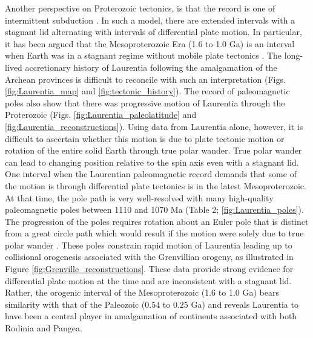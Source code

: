 \documentclass[twocolumn, switch]{article} %
\begin{document}
Another perspective on Proterozoic tectonics, is that the record is one of intermittent subduction \citep{Silver2008a, ONeill2013a}. In such a model, there are extended intervals with a stagnant lid alternating with intervals of differential plate motion. In particular, it has been argued that the Mesoproterozoic Era (1.6 to 1.0 Ga) is an interval when Earth was in a stagnant regime without mobile plate tectonics \citep{Silver2008a, ONeill2013a}. The long-lived accretionary history of Laurentia following the amalgamation of the Archean provinces is difficult to reconcile with such an interpretation (Figs. \ref{fig:Laurentia_map} and \ref{fig:tectonic_history}). The record of paleomagnetic poles also show that there was progressive motion of Laurentia through the Proterozoic (Figs. \ref{fig:Laurentia_paleolatitude} and \ref{fig:Laurentia_reconstructions}). Using data from Laurentia alone, however, it is difficult to ascertain whether this motion is due to plate tectonic motion or rotation of the entire solid Earth through true polar wander. True polar wander can lead to changing position relative to the spin axis even with a stagnant lid. One interval when the Laurentian paleomagnetic record demands that some of the motion is through differential plate tectonics is in the latest Mesoproterozoic. At that time, the pole path is very well-resolved with many high-quality paleomagnetic poles between 1110 and 1070 Ma (Table 2; \ref{fig:Laurentia_poles}). The progression of the poles requires rotation about an Euler pole that is distinct from a great circle path which would result if the motion were solely due to true polar wander \citep{Swanson-Hysell2019a}. These poles constrain rapid motion of Laurentia leading up to collisional orogenesis associated with the Grenvillian orogeny, as illustrated in Figure \ref{fig:Grenville_reconstructions}. These data provide strong evidence for differential plate motion at the time and are inconsistent with a stagnant lid. Rather, the orogenic interval of the Mesoproterozoic (1.6 to 1.0 Ga) bears similarity with that of the Paleozoic (0.54 to 0.25 Ga) and reveals Laurentia to have been a central player in amalgamation of continents associated with both Rodinia and Pangea.
\end{document}
